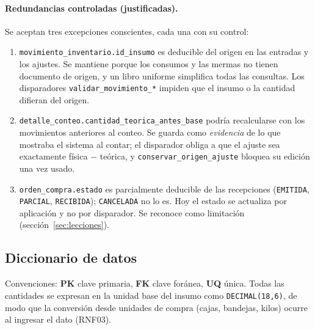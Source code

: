 \documentclass[11pt,letterpaper]{article}
\begin{document}
\paragraph{Redundancias controladas (justificadas).} Se aceptan tres excepciones conscientes, cada una con su control:
\begin{enumerate}[leftmargin=*,itemsep=1pt]
  \item \texttt{movimiento\_inventario.id\_insumo} es deducible del origen en las entradas y los ajustes. Se mantiene porque los consumos y las mermas no tienen documento de origen, y un libro uniforme simplifica todas las consultas. Los disparadores \texttt{validar\_movimiento\_*} impiden que el insumo o la cantidad difieran del origen.
  \item \texttt{detalle\_conteo.cantidad\_teorica\_antes\_base} podría recalcularse con los movimientos anteriores al conteo. Se guarda como \emph{evidencia} de lo que mostraba el sistema al contar; el disparador obliga a que el ajuste sea exactamente física $-$ teórica, y \texttt{conservar\_origen\_ajuste} bloquea su edición una vez usado.
  \item \texttt{orden\_compra.estado} es parcialmente deducible de las recepciones (\texttt{EMITIDA}, \texttt{PARCIAL}, \texttt{RECIBIDA}); \texttt{CANCELADA} no lo es. Hoy el estado se actualiza por aplicación y no por disparador. Se reconoce como limitación (sección~\ref{sec:lecciones}).
\end{enumerate}

\subsection{Diccionario de datos}
Convenciones: \textbf{PK} clave primaria, \textbf{FK} clave foránea, \textbf{UQ} única. Todas las cantidades se expresan en la unidad base del insumo como \texttt{DECIMAL(18,6)}, de modo que la conversión desde unidades de compra (cajas, bandejas, kilos) ocurre al ingresar el dato (RNF03).
\end{document}
